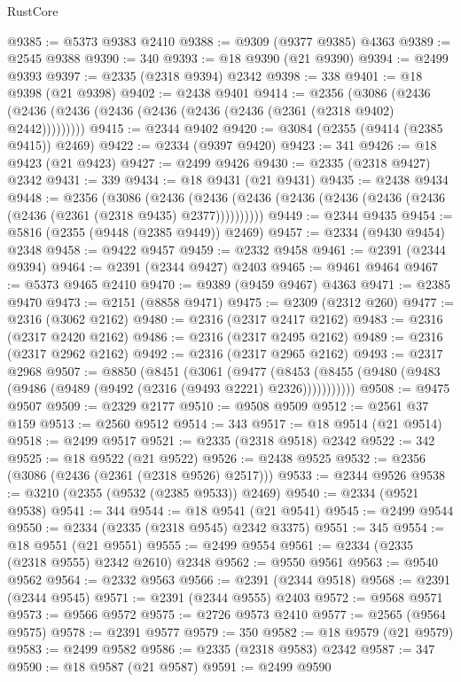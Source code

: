 \begin{lexlean}{RustCore}
\begin{coremodule}
@9385 := @5373 @9383 @2410
@9388 := @9309 (@9377 @9385) @4363
@9389 := @2545 @9388
@9390 := 340
@9393 := @18 @9390 (@21 @9390)
@9394 := @2499 @9393
@9397 := @2335 (@2318 @9394) @2342
@9398 := 338
@9401 := @18 @9398 (@21 @9398)
@9402 := @2438 @9401
@9414 := @2356
    (@3086 (@2436 (@2436 (@2436 (@2436 (@2436 (@2436 (@2436 (@2361 (@2318 @9402) @2442)))))))))
@9415 := @2344 @9402
@9420 := @3084 (@2355 (@9414 (@2385 @9415)) @2469)
@9422 := @2334 (@9397 @9420)
@9423 := 341
@9426 := @18 @9423 (@21 @9423)
@9427 := @2499 @9426
@9430 := @2335 (@2318 @9427) @2342
@9431 := 339
@9434 := @18 @9431 (@21 @9431)
@9435 := @2438 @9434
@9448 := @2356
    (@3086
      (@2436 (@2436 (@2436 (@2436 (@2436 (@2436 (@2436 (@2436 (@2361 (@2318 @9435) @2377))))))))))
@9449 := @2344 @9435
@9454 := @5816 (@2355 (@9448 (@2385 @9449)) @2469)
@9457 := @2334 (@9430 @9454) @2348
@9458 := @9422 @9457
@9459 := @2332 @9458
@9461 := @2391 (@2344 @9394)
@9464 := @2391 (@2344 @9427) @2403
@9465 := @9461 @9464
@9467 := @5373 @9465 @2410
@9470 := @9389 (@9459 @9467) @4363
@9471 := @2385 @9470
@9473 := @2151 (@8858 @9471)
@9475 := @2309 (@2312 @260)
@9477 := @2316 (@3062 @2162)
@9480 := @2316 (@2317 @2417 @2162)
@9483 := @2316 (@2317 @2420 @2162)
@9486 := @2316 (@2317 @2495 @2162)
@9489 := @2316 (@2317 @2962 @2162)
@9492 := @2316 (@2317 @2965 @2162)
@9493 := @2317 @2968
@9507 := @8850
    (@8451
      (@3061
        (@9477
          (@8453 (@8455 (@9480 (@9483 (@9486 (@9489 (@9492 (@2316 (@9493 @2221) @2326)))))))))))
@9508 := @9475 @9507
@9509 := @2329 @2177
@9510 := @9508 @9509
@9512 := @2561 @37 @159
@9513 := @2560 @9512
@9514 := 343
@9517 := @18 @9514 (@21 @9514)
@9518 := @2499 @9517
@9521 := @2335 (@2318 @9518) @2342
@9522 := 342
@9525 := @18 @9522 (@21 @9522)
@9526 := @2438 @9525
@9532 := @2356 (@3086 (@2436 (@2361 (@2318 @9526) @2517)))
@9533 := @2344 @9526
@9538 := @3210 (@2355 (@9532 (@2385 @9533)) @2469)
@9540 := @2334 (@9521 @9538)
@9541 := 344
@9544 := @18 @9541 (@21 @9541)
@9545 := @2499 @9544
@9550 := @2334 (@2335 (@2318 @9545) @2342 @3375)
@9551 := 345
@9554 := @18 @9551 (@21 @9551)
@9555 := @2499 @9554
@9561 := @2334 (@2335 (@2318 @9555) @2342 @2610) @2348
@9562 := @9550 @9561
@9563 := @9540 @9562
@9564 := @2332 @9563
@9566 := @2391 (@2344 @9518)
@9568 := @2391 (@2344 @9545)
@9571 := @2391 (@2344 @9555) @2403
@9572 := @9568 @9571
@9573 := @9566 @9572
@9575 := @2726 @9573 @2410
@9577 := @2565 (@9564 @9575)
@9578 := @2391 @9577
@9579 := 350
@9582 := @18 @9579 (@21 @9579)
@9583 := @2499 @9582
@9586 := @2335 (@2318 @9583) @2342
@9587 := 347
@9590 := @18 @9587 (@21 @9587)
@9591 := @2499 @9590

\end{coremodule}
\end{lexlean}

